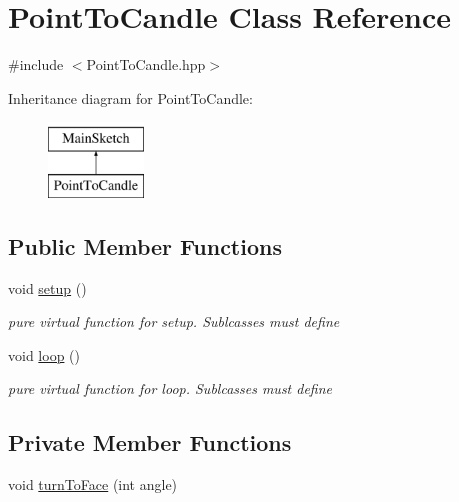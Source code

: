 \hypertarget{classPointToCandle}{\section{Point\-To\-Candle Class Reference}
\label{classPointToCandle}
}


{\ttfamily \#include $<$Point\-To\-Candle.\-hpp$>$}

Inheritance diagram for Point\-To\-Candle\-:\begin{figure}[H]
\begin{center}
\leavevmode
\includegraphics[height=2.000000cm]{classPointToCandle}
\end{center}
\end{figure}
\subsection*{Public Member Functions}
\begin{DoxyCompactItemize}
\item 
void \hyperlink{classPointToCandle_a99ace73720580afda4a41cf01c2418a2}{setup} ()
\begin{DoxyCompactList}\small\item\em pure virtual function for setup. Sublcasses must define \end{DoxyCompactList}\item 
void \hyperlink{classPointToCandle_a446be96046c19b1eff25cf2fcc92ccec}{loop} ()
\begin{DoxyCompactList}\small\item\em pure virtual function for loop. Sublcasses must define \end{DoxyCompactList}\end{DoxyCompactItemize}
\subsection*{Private Member Functions}
\begin{DoxyCompactItemize}
\item 
void \hyperlink{classPointToCandle_a495758f0cc24a3287002d1dd1cdc9698}{turn\-To\-Face} (int angle)
\end{DoxyCompactItemize}
